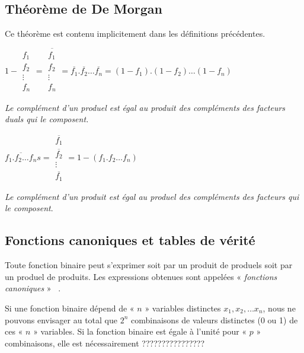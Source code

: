 \subsection{Théorème de De Morgan}

Ce théorème est contenu implicitement dans les définitions précédentes.

\begin{center}
$1-\begin{array}{|c|}
f_{1}\\
f_{2}\\
\vdots\\
f_{n}
\end{array}=\overline{\begin{array}{|c|}
f_{1}\\
f_{2}\\
\vdots\\
f_{n}
\end{array}}=\overline{f_{1}}.\overline{f_{2}}\ldots\overline{f_{n}}=(1-f_{1}).(1-f_{2})\ldots(1-f_{n})$
\end{center}

\textit{Le complément d'un produel est égal au produit des compléments
des facteurs duals qui le composent.}

\begin{center}
$\overline{f_{1}.f_{2}\ldots f_{n}}s=\begin{array}{|c|}
\overline{f_{1}}\\
\overline{f_{2}}\\
\vdots\\
\overline{f_{1}}
\end{array}=1-(f_{1}.f_{2}\ldots f_{n})$
\end{center}

\textit{Le complément d'un produit est égal au produel des compléments
des facteurs qui le composent}.

\subsection{Fonctions canoniques et tables de vérité}

Toute fonction binaire peut s'exprimer soit par un produit de produels
soit par un produel de produits. Les expressions obtenues sont appelées
« \textit{fonctions canoniques} » ~.

Si une fonction binaire dépend de « $n$ » variables distinctes
$x_{1},x_{2},\ldots x_{n}$, nous ne pouvons envisager au total que
$2^{n}$ combinaisons de valeurs distinctes (0 ou 1) de ces « $n$ » variables.
Si la fonction binaire est égale à l'unité pour « $p$ »  combinaisons,
elle est nécessairement ????????????????

